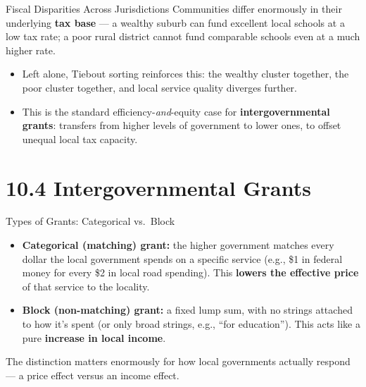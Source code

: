 \documentclass[11pt,aspectratio=169]{beamer}
\begin{document}
\begin{frame}{Fiscal Disparities Across Jurisdictions}
  Communities differ enormously in their underlying \textbf{tax base} --- a wealthy suburb can fund excellent local schools at a low tax rate; a poor rural district cannot fund comparable schools even at a much higher rate.
  \begin{itemize}
    \item Left alone, Tiebout sorting reinforces this: the wealthy cluster together, the poor cluster together, and local service quality diverges further.
    \item This is the standard efficiency-\emph{and}-equity case for \textbf{intergovernmental grants}: transfers from higher levels of government to lower ones, to offset unequal local tax capacity.
  \end{itemize}
\end{frame}

\section{10.4 Intergovernmental Grants}

\begin{frame}{Types of Grants: Categorical vs.\ Block}
  \begin{itemize}
    \item \textbf{Categorical (matching) grant:} the higher government matches every dollar the local government spends on a specific service (e.g., \$1 in federal money for every \$2 in local road spending). This \textbf{lowers the effective price} of that service to the locality.
    \item \textbf{Block (non-matching) grant:} a fixed lump sum, with no strings attached to how it's spent (or only broad strings, e.g., ``for education''). This acts like a pure \textbf{increase in local income}.
  \end{itemize}
  \small The distinction matters enormously for how local governments actually respond --- a price effect versus an income effect.
\end{frame}
\end{document}
